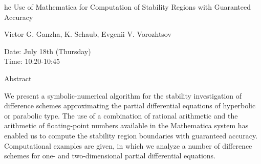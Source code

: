 \begin{center}
\LARGE
he Use of Mathematica for Computation of Stability
              Regions with Guaranteed Accuracy

\end{center}

\begin{center}
\Large
Victor G. Ganzha, K. Schaub, Evgenii V. Vorozhtsov

\end{center}

\noindent
Date:  July 18th (Thursday)\\
Time:  10:20-10:45\\

\begin{center}
\large
Abstract
\end{center}

We present a symbolic-numerical algorithm for the stability investigation of difference schemes
approximating the partial differential equations of hyperbolic or parabolic type. The use of a
combination of rational arithmetic and the arithmetic of floating-point numbers available in the
Mathematica system has enabled us to compute the stability region boundaries with guaranteed
accuracy. Computational examples are given, in which we analyze a number of difference schemes
for one- and two-dimensional partial differential equations. 

